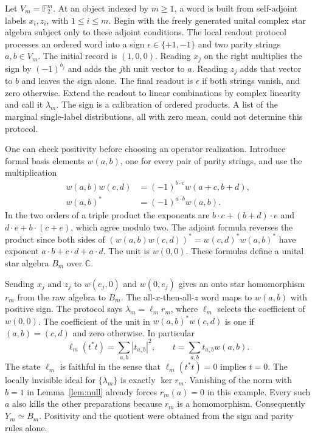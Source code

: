 \documentclass[11pt,letterpaper]{article}
\begin{document}
Let $V_m=\mathbb F_2^m$. At an object indexed by $m\ge1$, a word is built from self-adjoint labels $x_i,z_i$, with $1\le i\le m$. Begin with the freely generated unital complex star algebra subject only to these adjoint conditions. The local readout protocol processes an ordered word into a sign $\epsilon\in\{+1,-1\}$ and two parity strings $a,b\in V_m$. The initial record is $(1,0,0)$. Reading $x_j$ on the right multiplies the sign by $(-1)^{b_j}$ and adds the $j$th unit vector to $a$. Reading $z_j$ adds that vector to $b$ and leaves the sign alone. The final readout is $\epsilon$ if both strings vanish, and zero otherwise. Extend the readout to linear combinations by complex linearity and call it $\lambda_m$. The sign is a calibration of ordered products. A list of the marginal single-label distributions, all with zero mean, could not determine this protocol.

One can check positivity before choosing an operator realization. Introduce formal basis elements $w(a,b)$, one for every pair of parity strings, and use the multiplication
\begin{align}
 w(a,b)w(c,d)&=(-1)^{b\cdot c}w(a+c,b+d),               \label{eq:twist}\\
 w(a,b)^*&=(-1)^{a\cdot b}w(a,b).                       \label{eq:invol}
\end{align}
In the two orders of a triple product the exponents are $b\cdot c+(b+d)\cdot e$ and $d\cdot e+b\cdot(c+e)$, which agree modulo two. The adjoint formula reverses the product since both sides of $(w(a,b)w(c,d))^*=w(c,d)^*w(a,b)^*$ have exponent $a\cdot b+c\cdot d+a\cdot d$. The unit is $w(0,0)$. These formulas define a unital star algebra $B_m$ over $\mathbb C$.

Sending $x_j$ and $z_j$ to $w(e_j,0)$ and $w(0,e_j)$ gives an onto star homomorphism $r_m$ from the raw algebra to $B_m$. The all-$x$-then-all-$z$ word maps to $w(a,b)$ with positive sign. The protocol says $\lambda_m=\ell_m r_m$, where $\ell_m$ selects the coefficient of $w(0,0)$. The coefficient of the unit in $w(a,b)^*w(c,d)$ is one if $(a,b)=(c,d)$ and zero otherwise. In particular
\[
 \ell_m(t^*t)=\sum_{a,b}|t_{a,b}|^2,\qquad
 t=\sum_{a,b}t_{a,b}w(a,b).
\]
The state $\ell_m$ is faithful in the sense that $\ell_m(t^*t)=0$ implies $t=0$. The locally invisible ideal for $\{\lambda_m\}$ is exactly $\ker r_m$. Vanishing of the norm with $b=1$ in Lemma~\ref{lem:null} already forces $r_m(a)=0$ in this example. Every such $a$ also kills the other preparations because $r_m$ is a homomorphism. Consequently $Y_m\simeq B_m$. Positivity and the quotient were obtained from the sign and parity rules alone.
\end{document}

